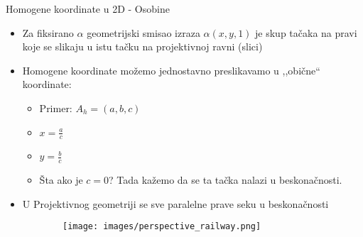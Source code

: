 \documentclass[bookmarks=true,bookmarksopen=true,pdfborder={0 0 0},pdfhighlight={/N},linkbordercolor={.5 .5 .5},implicit=false,unicode,xcolor={table}]{beamer}
\begin{document}
\begin{frame}{Homogene koordinate u 2D - Osobine}

  \begin{itemize}
    \item Za fiksirano $\alpha$ geometrijski smisao izraza $\alpha (x, y, 1)$ je skup tačaka na pravi koje se slikaju u istu tačku na 
          projektivnoj ravni (slici)
    \item Homogene koordinate možemo jednostavno preslikavamo u ,,obične`` koordinate:
      \begin{itemize}
        \item Primer: $A_{h} = (a, b, c)$
        \item $x = \frac{a}{c}$
        \item $y = \frac{b}{c}$
        \item Šta ako je $c = 0$? Tada kažemo da se ta tačka nalazi u beskonačnosti.
      \end{itemize}
    \item U Projektivnog geometriji se sve paralelne prave seku u beskonačnosti
  \end{itemize}
  \begin{figure}
    \begin{subfigure}{4cm}
      \texttt{[image: images/perspective\_railway.png]}
    \end{subfigure}
  \end{figure}
  
\end{frame}
\end{document}
